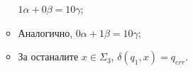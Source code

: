 \begin{hint}
\begin{itemize}
\begin{itemize}
      $1\alpha + 0\beta = 10\gamma$;
    \item
      Аналогично, $0\alpha + 1\beta = 10\gamma$;
    \item
      За останалите $x \in \Sigma_3$, $\delta(q_{1},x) = q_{err}$.
    \end{itemize}    
  \end{itemize}
\end{hint}
\fi

